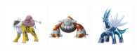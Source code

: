 \documentclass[12pt]{beamer}
\begin{document}
\begin{frame}[label=Ground]
\begin{footnotesize}
\begin{block}{}
\begin{center}
    \includegraphics[width=1.5cm]{../../images/pokemon/raikou.png}
    \includegraphics[width=1.5cm]{../../images/pokemon/heatran.png}
    \includegraphics[width=1.5cm]{../../images/pokemon/dialga.png}
    \end{center}
\end{block}

\end{footnotesize}
\end{frame}


\end{document}
